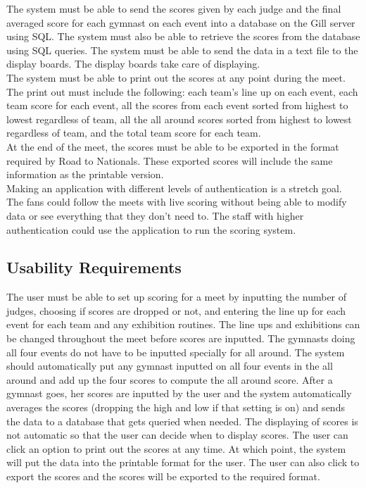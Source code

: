 \documentclass[letterpaper,10pt,draftclsnofoot,onecolumn,]{article}
\begin{document}
\noindent The system must be able to send the scores given by each judge and the final averaged score for each gymnast on each event into a database on the Gill server using SQL. The system must also be able to retrieve the scores from the database using SQL queries. The system must be able to send the data in a text file to the display boards. The display boards take care of displaying.\\

\noindent The system must be able to print out the scores at any point during the meet. The print out must include the following: each team's line up on each event, each team score for each event, all the scores from each event sorted from highest to lowest regardless of team, all the all around scores sorted from highest to lowest regardless of team, and the total team score for each team.\\

\noindent At the end of the meet, the scores must be able to be exported in the format required by Road to Nationals. These exported scores will include the same information as the printable version.\\

\noindent Making an application with different levels of authentication is a stretch goal. The fans could follow the meets with live scoring without being able to modify data or see everything that they don't need to. The staff with higher authentication could use the application to run the scoring system.

\subsection{Usability Requirements}
The user must be able to set up scoring for a meet by inputting the number of judges, choosing if scores are dropped or not, and entering the line up for each event for each team and any exhibition routines. The line ups and exhibitions can be changed throughout the meet before scores are inputted. The gymnasts doing all four events do not have to be inputted specially for all around. The system should automatically put any gymnast inputted on all four events in the all around and add up the four scores to compute the all around score. After a gymnast goes, her scores are inputted by the user and the system automatically averages the scores (dropping the high and low if that setting is on) and sends the data to a database that gets queried when needed. The displaying of scores is not automatic so that the user can decide when to display scores. The user can click an option to print out the scores at any time. At which point, the system will put the data into the printable format for the user. The user can also click to export the scores and the scores will be exported to the required format.\\
\end{document}
